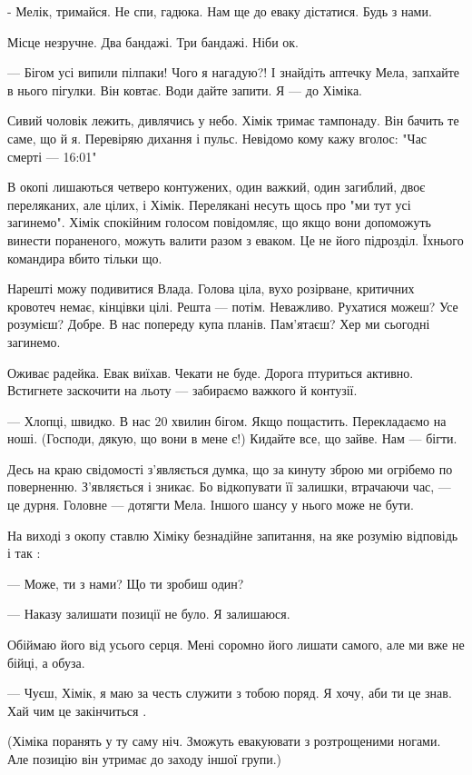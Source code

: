 - Мелік, тримайся. Не спи, гадюка. Нам ще до еваку дістатися. Будь з нами. 

Місце незручне. Два бандажі. Три бандажі. Ніби ок. 

— Бігом усі випили пілпаки! Чого я нагадую?! І знайдіть аптечку Мела, запхайте
в нього пігулки. Він ковтає. Води дайте запити.  Я — до Хіміка. 

Сивий чоловік лежить, дивлячись у небо. Хімік тримає тампонаду.  Він бачить те
саме, що й я. Перевіряю дихання і пульс. Невідомо кому кажу вголос: "Час смерті
— 16:01" 

В окопі лишаються четверо контужених,  один важкий, один загиблий, двоє
переляканих, але цілих, і Хімік.  Перелякані несуть щось про "ми тут усі
загинемо". Хімік спокійним голосом повідомляє, що якщо вони допоможуть винести
пораненого, можуть валити разом з еваком. Це не його підрозділ. Їхнього
командира вбито тільки що. 

Нарешті можу подивитися Влада. Голова ціла, вухо розірване, критичних кровотеч
немає, кінцівки цілі. Решта — потім. Неважливо. Рухатися можеш? Усе розумієш?
Добре. В нас попереду купа планів. Пам'ятаєш? Хер ми сьогодні загинемо. 

Оживає радейка. Евак виїхав. Чекати не буде. Дорога птуриться активно.
Встигнете заскочити на льоту — забираємо важкого й контузії.

— Хлопці, швидко. В нас 20 хвилин бігом. Якщо пощастить. Перекладаємо на ноші.
(Господи, дякую, що вони в мене є!) Кидайте все, що зайве. Нам — бігти. 

Десь на краю свідомості з'являється думка, що за кинуту зброю ми  огрібемо по
поверненню. З'являється і зникає. Бо відкопувати її залишки, втрачаючи час, —
це дурня. Головне — дотягти Мела. Іншого шансу у нього може не бути. 

На виході з окопу ставлю Хіміку безнадійне запитання, на яке розумію  відповідь
і так :

— Може, ти з нами? Що ти зробиш один?

— Наказу залишати позиції не було. Я залишаюся. 

Обіймаю його від усього серця.  Мені соромно його лишати самого, але ми вже не
бійці, а обуза. 

— Чуєш, Хімік, я маю за честь служити з тобою поряд. Я хочу, аби ти це знав.
Хай чим це закінчиться . 

(Хіміка поранять у ту саму ніч. Зможуть евакуювати з розтрощеними ногами. Але
позицію він утримає до заходу іншої групи.)

